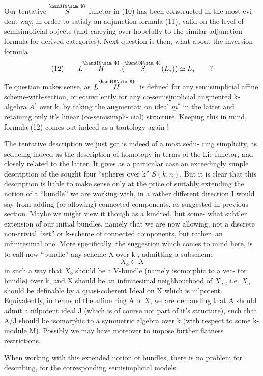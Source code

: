 
Our tentative $\overset{\hand{$\sim$}}{S}$ functor in (10) has been constructed in the most evi-%
dent way,  in order to satisfy an adjunction formula (11),  valid on
the level of semisimplicial objects  (and carrying over\hand{,} hopefully\hand{,}
to the similar adjunction formula for  derived categories).
Next question is then,  what about the inversion formula
\[
(12)\qquad L\overset{\hand{$\sim$}}{H}.(\overset{\hand{$\sim$}}{S}(L_*))\simeq L_* \qquad ?
\]
Te question makes sense,  as  $L\overset{\hand{$\sim$}}{H}.$  is  defined for any
semisimplicial affine scheme-with-section, or equivalently for any
co-semis\uline{i}mplicial augmented k-algebra $A^*$ over k,  by taking the augmentati%
on ideal  $\underline{m}^*$  in the latter and retaining only it's linear (co-semisimpli-%
cial) structure.  Keeping this in mind,  formula (12) comes out indeed as
a tautology again !

The  tentative description we just got is indeed of a most sedu-%
cing simplicity,  as seducing indeed as the description of homotopy in
terms of the Lie functor,  and closely related to the latter.  It gives
as a particular case an exceedingly simple description of the sought
four ``spheres over k''  $S(k,n)$.  But it is clear that this description is
liable to make sense only at the price of suitably extending the notion
of a ``bundle'' we are working with,  in a rather different direction I
would say from adding (or allowing) connected components, as suggested in
previous section.  Maybe we might view it though as a kindred,  but some-%
what subtler extension of our initial bundles,  namely that we are
now allowing,  not a discrete non-trivial ``set'' or k-scheme of connected
components,  but rather,  an infinitesimal one.  More specifically,
the suggestion which comes to mind here,  is to call now ``bundle''  any
scheme  X over  k ,  admitting a subscheme
\[
X_o \subset X
\]
in such a way that $X_o$ should be a V-bundle (namely isomorphic to a vec-%
tor bundle) over k,  and X should be an infinitesimal neighbourhood of
$X_o$ ,  i.e. $X_o$ should be definable by a quasi-coherent Ideal  on X which
is nilpotent.  Equivalently,  in terms of the affine ring A of X,  we
are demanding that A should admit a nilpotent ideal J (which is of course
not part of it's structure),  such that A/J should be isomorphic to a
symmetric algebra over k (with respect to some k-module M).  Possibly
we may have moreover to impose further flatness restrictions.

When working with this extended notion of bundles,  there is no
problem for describing,  for the corresponding semisimplicial models

